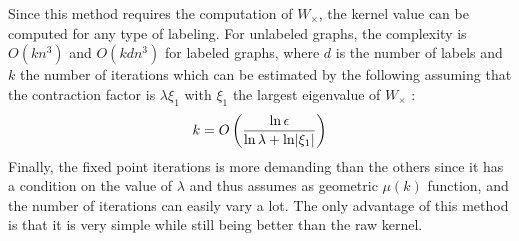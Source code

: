 \documentclass{article}
\DeclarePairedDelimiter{\abs}{\lvert}{\rvert}
\theoremstyle{definition}
\begin{document}
Since this method requires the computation of $W_\times$, the kernel value can be computed for any type of labeling. For unlabeled graphs, the complexity is $O(kn^3)$ and $O(kdn^3)$ for labeled graphs, where $d$ is the number of labels and $k$ the number of iterations which can be estimated by the following assuming that the contraction factor is $\lambda\xi_1$ with $\xi_1$ the largest eigenvalue of $W_\times$ :
\begin{equation}
	k=O\left(\frac{\ln \epsilon}{\ln \lambda + \ln \abs{\xi_1}}\right)
\end{equation}
Finally, the fixed point iterations is more demanding than the others since it has a condition on the value of $\lambda$ and thus assumes as geometric $\mu(k)$ function, and the number of iterations can easily vary a lot. The only advantage of this method is that it is very simple while still being better than the raw kernel.
\end{document}
